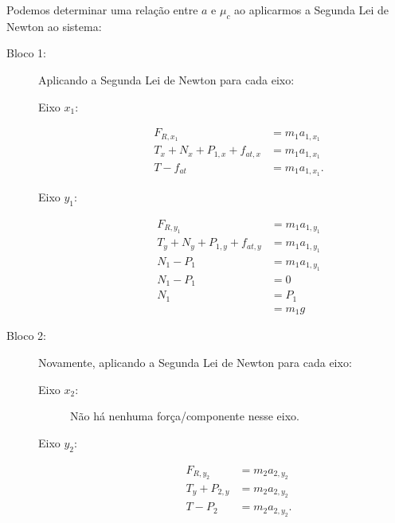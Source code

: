 Podemos determinar uma relação entre $a$ e $\mu_c$ ao aplicarmos a Segunda Lei de Newton ao sistema:
\begin{description}
    \item[Bloco 1:] Aplicando a Segunda Lei de Newton para cada eixo:
        \begin{description}
            \item[Eixo $x_1$:]
                \begin{align}
                    F_{R, x_1} &= m_1 a_{1,x_1} \\
                    T_x + N_x + P_{1,x} + f_{at,x} &= m_1 a_{1,x_1} \\
                    T - f_{at} &= m_1 a_{1,x_1}. \label{Eq:AtritoAtwoodHorizX1}
                \end{align}
            \item[Eixo $y_1$:]
                \begin{align}
                    F_{R, y_1} &= m_1 a_{1,y_1} \\
                    T_y + N_y + P_{1,y} + f_{at,y} &= m_1 a_{1,y_1} \\
                    N_1 - P_1 &= m_1 a_{1,y_1} \\
                    N_1 - P_1 &= 0 \\
                    N_1 &= P_1 \\
                    &= m_1 g
                \end{align}
        \end{description}
    \item[Bloco 2:] Novamente, aplicando a Segunda Lei de Newton para cada eixo:
        \begin{description}
            \item[Eixo $x_2$:] Não há nenhuma força/componente nesse eixo.
            \item[Eixo $y_2$:]
                \begin{align}
                    F_{R, y_2} &= m_2 a_{2,y_2} \\
                    T_y + P_{2,y} &= m_2 a_{2,y_2} \\
                    T - P_2 &= m_2 a_{2,y_2}. \label{Eq:AtritoAtwoodHorizY2}
                \end{align}
        \end{description}
\end{description}


